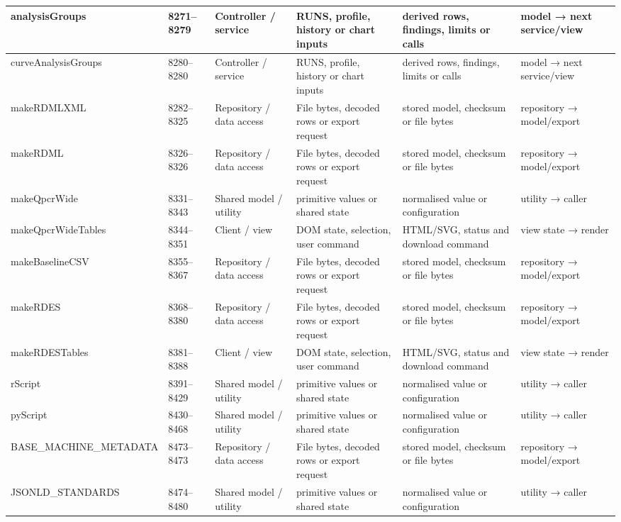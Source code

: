 \begin{landscape}
\begin{longtable}{@{}p{3.2cm}p{1.45cm}p{2.7cm}p{4.0cm}p{4.0cm}p{3.0cm}@{}}
analysisGroups & 8271--8279 & Controller / service & RUNS, profile, history or chart inputs & derived rows, findings, limits or calls & model → next service/view \\\hline
curveAnalysisGroups & 8280--8280 & Controller / service & RUNS, profile, history or chart inputs & derived rows, findings, limits or calls & model → next service/view \\\hline
makeRDMLXML & 8282--8325 & Repository / data access & File bytes, decoded rows or export request & stored model, checksum or file bytes & repository → model/export \\\hline
makeRDML & 8326--8326 & Repository / data access & File bytes, decoded rows or export request & stored model, checksum or file bytes & repository → model/export \\\hline
makeQpcrWide & 8331--8343 & Shared model / utility & primitive values or shared state & normalised value or configuration & utility → caller \\\hline
makeQpcrWideTables & 8344--8351 & Client / view & DOM state, selection, user command & HTML/SVG, status and download command & view state → render \\\hline
makeBaselineCSV & 8355--8367 & Repository / data access & File bytes, decoded rows or export request & stored model, checksum or file bytes & repository → model/export \\\hline
makeRDES & 8368--8380 & Repository / data access & File bytes, decoded rows or export request & stored model, checksum or file bytes & repository → model/export \\\hline
makeRDESTables & 8381--8388 & Client / view & DOM state, selection, user command & HTML/SVG, status and download command & view state → render \\\hline
rScript & 8391--8429 & Shared model / utility & primitive values or shared state & normalised value or configuration & utility → caller \\\hline
pyScript & 8430--8468 & Shared model / utility & primitive values or shared state & normalised value or configuration & utility → caller \\\hline
BASE\_MACHINE\_METADATA & 8473--8473 & Repository / data access & File bytes, decoded rows or export request & stored model, checksum or file bytes & repository → model/export \\\hline
JSONLD\_STANDARDS & 8474--8480 & Shared model / utility & primitive values or shared state & normalised value or configuration & utility → caller \\\hline

\end{longtable}
\end{landscape}
